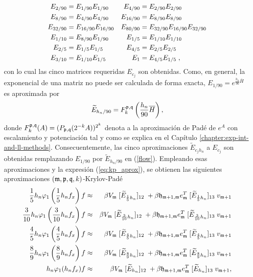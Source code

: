 \begin{align}
    E_{2/90}& =E_{1/90}E_{1/90} & E_{4/90}& =E_{2/90}E_{2/90}  \notag \\
    E_{8/90}& =E_{4/90}E_{4/90} & E_{16/90}& =E_{8/90}E_{8/90}  \notag \\
    E_{32/90}& =E_{16/90}E_{16/90} & E_{80/90}& =E_{32/90}E_{16/90}E_{32/90}
    \label{flow} \\
    E_{1/10}& =E_{8/90}E_{1/90} & E_{1/5}& =E_{1/10}E_{1/10}  \notag \\
    E_{2/5}& =E_{1/5}E_{1/5} & E_{4/5}& =E_{2/5}E_{2/5}  \notag \\
    E_{3/10}& =E_{1/10}E_{1/5} & E_{1}& =E_{4/5}E_{1/5}\;,  \notag
\end{align}
con lo cual las cinco matrices requeridas $E_{c_j}$ son obtenidas. Como, en general, la exponencial de una matriz no puede ser calculada de forma exacta, $E_{1/90}=e^{\frac{h_n}{90}\overline{H}}$ es aproximada por
\[\widetilde{E}_{h_n/90} = F_k^{\mathfrak{p},\mathfrak{q}}\left(\frac{h_n}{90}\overline{H}\right), \]
donde $F_k^{\mathfrak{p},\mathfrak{q}}(A)=(P_{\mathfrak{p},\mathfrak{q}}(2^{-k}A))^{2^k}$ denota a la aproximación de Padé de $e^A$ con escalamiento y potenciación tal y como se explica en el Capítulo \ref{chapter:exp-int-and-ll-methods}. Consecuentemente, las cinco aproximaciones $\widetilde{E}_{c_jh_n}$ a $E_{c_j}$ son obtenidas remplazando $E_{1/90}$ por $\widetilde{E}_{h_n/90}$ en (\ref{flow}). Empleando esas aproximaciones y la expresión (\ref{eq:kp_aprox}), se obtienen las siguientes aproximaciones $(\mathfrak{m} , \mathfrak{p} ,\mathfrak{q} , k)$-Krylov-Padé
\begin{eqnarray}
    \frac{1}{5}h_n\varphi_1\left(\frac{1}{5}h_n f_x\right)f & \approx & \beta   V_{\mathfrak{m}}\; [\widetilde{E}_{\frac{1}{5}h_n}]_{12}\;  + \beta \mathfrak{h}_{\mathfrak{m}+1,\mathfrak{m}}e_{\mathfrak{m}}^T\; [\widetilde{E}_{\frac{1}{5}h_n}]_{13}\;  v_{\mathfrak{m}+1} \notag \\
    \frac{3}{10}h_n\varphi_1\left(\frac{3}{10}h_n f_x\right)f & \approx & \beta   V_{\mathfrak{m}}\; [\widetilde{E}_{\frac{3}{10}h_n}]_{12}\;  + \beta \mathfrak{h}_{\mathfrak{m}+1,\mathfrak{m}}e_{\mathfrak{m}}^T\; [\widetilde{E}_{\frac{3}{10}h_n}]_{13}\;  v_{\mathfrak{m}+1} \notag \\
    \frac{4}{5}h_n\varphi_1\left(\frac{4}{5}h_n f_x\right)f & \approx & \beta   V_{\mathfrak{m}}\; [\widetilde{E}_{\frac{4}{5}h_n}]_{12}\;  + \beta \mathfrak{h}_{\mathfrak{m}+1,\mathfrak{m}}e_{\mathfrak{m}}^T\; [\widetilde{E}_{\frac{4}{5}h_n}]_{13}\;  v_{\mathfrak{m}+1} \label{phi_appox} \\
    \frac{8}{9}h_n\varphi_1\left(\frac{8}{9}h_n f_x\right)f & \approx & \beta   V_{\mathfrak{m}}\; [\widetilde{E}_{\frac{8}{9}h_n}]_{12}\;  + \beta \mathfrak{h}_{\mathfrak{m}+1,\mathfrak{m}}e_{\mathfrak{m}}^T\; [\widetilde{E}_{\frac{8}{9}h_n}]_{13}\;  v_{\mathfrak{m}+1} \notag \\
    h_n\varphi_1(h_n f_x)f & \approx &  \beta V_{\mathfrak{m}}\; [\widetilde{E}_{h_n}]_{12}\;  + \beta\mathfrak{h}_{\mathfrak{m}+1,\mathfrak{m}}e_{\mathfrak{m}}^T\; [\widetilde{E}_{h_n}]_{13}\;  v_{\mathfrak{m}+1}, \notag
\end{eqnarray}
